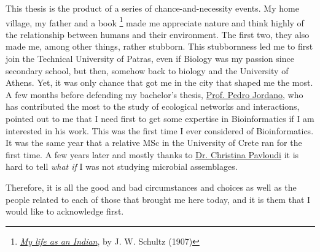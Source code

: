 \documentclass[master=elt, cleveref, autoref, masteroption=eg]{kulemt}
\begin{document}
\begin{preface}
   This thesis is the product of a series of chance-and-necessity events.
   My home village, my father and a book
   \footnote{\href{https://www.simonandschuster.com/books/My-Life-as-an-Indian/J-W-Schultz/9781634504270}{\textit{My life as an Indian}}, by J. W. Schultz (1907)} 
   made me appreciate nature and think highly of the relationship between humans and their environment. 
   The first two, they also made me, among other things, rather stubborn. 
   This stubbornness led me to first join the Technical University of Patras,
   even if Biology was my passion since secondary school,
   but then, somehow back to biology and the University of Athens. 
   Yet, it was only chance that got me in the city that shaped me the most.
   A few months before defending my bachelor's thesis,
   \href{http://ebd10.ebd.csic.es/}{Prof. Pedro Jordano},
   who has contributed the most to the study of ecological networks and interactions,
   pointed out to me 
   that I need first to get some expertise in Bioinformatics if I am interested in his work.
   This was the first time I ever considered of Bioinformatics.
   It was the same year that a relative MSc in the University of Crete ran for the first time. 
   A few years later and mostly thanks to \href{https://cpavloud.github.io/mysite/}{Dr. Christina Pavloudi}  
   it is hard to tell \textit{what if} I was not studying microbial assemblages.

   Therefore, it is all the good and bad circumstances and choices as well as the people 
   related to each of those 
   that brought me here today, 
   and it is them
   that I would like to acknowledge first.


\end{preface}
\end{document}
